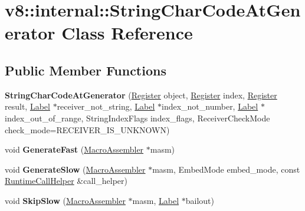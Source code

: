 \hypertarget{classv8_1_1internal_1_1_string_char_code_at_generator}{}\section{v8\+:\+:internal\+:\+:String\+Char\+Code\+At\+Generator Class Reference}
\label{classv8_1_1internal_1_1_string_char_code_at_generator}
\subsection*{Public Member Functions}
\begin{DoxyCompactItemize}
\item 
{\bfseries String\+Char\+Code\+At\+Generator} (\hyperlink{structv8_1_1internal_1_1_register}{Register} object, \hyperlink{structv8_1_1internal_1_1_register}{Register} index, \hyperlink{structv8_1_1internal_1_1_register}{Register} result, \hyperlink{classv8_1_1internal_1_1_label}{Label} $\ast$receiver\+\_\+not\+\_\+string, \hyperlink{classv8_1_1internal_1_1_label}{Label} $\ast$index\+\_\+not\+\_\+number, \hyperlink{classv8_1_1internal_1_1_label}{Label} $\ast$index\+\_\+out\+\_\+of\+\_\+range, String\+Index\+Flags index\+\_\+flags, Receiver\+Check\+Mode check\+\_\+mode=R\+E\+C\+E\+I\+V\+E\+R\+\_\+\+I\+S\+\_\+\+U\+N\+K\+N\+O\+WN)\hypertarget{classv8_1_1internal_1_1_string_char_code_at_generator_a0acf2723254798ec767056cac2874e49}{}\label{classv8_1_1internal_1_1_string_char_code_at_generator_a0acf2723254798ec767056cac2874e49}

\item 
void {\bfseries Generate\+Fast} (\hyperlink{classv8_1_1internal_1_1_macro_assembler}{Macro\+Assembler} $\ast$masm)\hypertarget{classv8_1_1internal_1_1_string_char_code_at_generator_a9d060d07da2596360ac418290bb7073f}{}\label{classv8_1_1internal_1_1_string_char_code_at_generator_a9d060d07da2596360ac418290bb7073f}

\item 
void {\bfseries Generate\+Slow} (\hyperlink{classv8_1_1internal_1_1_macro_assembler}{Macro\+Assembler} $\ast$masm, Embed\+Mode embed\+\_\+mode, const \hyperlink{classv8_1_1internal_1_1_runtime_call_helper}{Runtime\+Call\+Helper} \&call\+\_\+helper)\hypertarget{classv8_1_1internal_1_1_string_char_code_at_generator_a23509ca65eef927d7345eaa6cb8595f4}{}\label{classv8_1_1internal_1_1_string_char_code_at_generator_a23509ca65eef927d7345eaa6cb8595f4}

\item 
void {\bfseries Skip\+Slow} (\hyperlink{classv8_1_1internal_1_1_macro_assembler}{Macro\+Assembler} $\ast$masm, \hyperlink{classv8_1_1internal_1_1_label}{Label} $\ast$bailout)\hypertarget{classv8_1_1internal_1_1_string_char_code_at_generator_ac71b49ded4155b066f9ec6797877a9cd}{}\label{classv8_1_1internal_1_1_string_char_code_at_generator_ac71b49ded4155b066f9ec6797877a9cd}

\end{DoxyCompactItemize}
